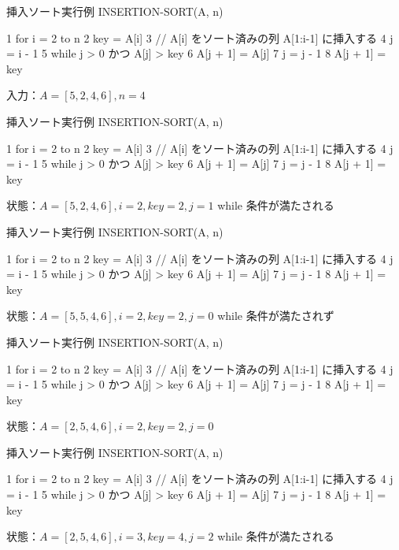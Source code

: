 \documentclass[unicode,11pt,aspectratio=169,notes]{beamer} %
\begin{document}
\begin{frame}[fragile]{挿入ソート}{実行例}
  INSERTION-SORT(A, n)
  \begin{semiverbatim}
1  for i = 2 to n
2    key = A[i]
3    // A[i] をソート済みの列 A[1:i-1] に挿入する
4    j = i - 1
5    while j > 0 かつ A[j] > key
6      A[j + 1] = A[j]
7      j = j - 1
8    A[j + 1] = key
  \end{semiverbatim}
  入力：$A = [5, 2, 4, 6], n = 4$
\end{frame}

\begin{frame}[fragile]{挿入ソート}{実行例}
  INSERTION-SORT(A, n)
  \begin{semiverbatim}
1  for i = 2 to n
2    key = A[i]
3    // A[i] をソート済みの列 A[1:i-1] に挿入する
4    j = i - 1
5    \alert{while j > 0 かつ A[j] > key}
6      A[j + 1] = A[j]
7      j = j - 1
8    A[j + 1] = key
  \end{semiverbatim}
  状態：$A = [5, 2, 4, 6], i = 2, key = 2, j = 1$ while 条件が満たされる
\end{frame}

\begin{frame}[fragile]{挿入ソート}{実行例}
  INSERTION-SORT(A, n)
  \begin{semiverbatim}
1  for i = 2 to n
2    key = A[i]
3    // A[i] をソート済みの列 A[1:i-1] に挿入する
4    j = i - 1
5    \alert{while j > 0 かつ A[j] > key}
6      A[j + 1] = A[j]
7      j = j - 1
8    A[j + 1] = key
  \end{semiverbatim}
  状態：$A = [5, 5, 4, 6], i = 2, key = 2, j = 0$ while 条件が満たされず
\end{frame}

\begin{frame}[fragile]{挿入ソート}{実行例}
  INSERTION-SORT(A, n)
  \begin{semiverbatim}
1  for i = 2 to n
2    key = A[i]
3    // A[i] をソート済みの列 A[1:i-1] に挿入する
4    j = i - 1
5    while j > 0 かつ A[j] > key
6      A[j + 1] = A[j]
7      j = j - 1
8    \alert{A[j + 1] = key}
  \end{semiverbatim}
  状態：$A = [2, 5, 4, 6], i = 2, key = 2, j = 0$
\end{frame}

\begin{frame}[fragile]{挿入ソート}{実行例}
  INSERTION-SORT(A, n)
  \begin{semiverbatim}
1  for i = 2 to n
2    key = A[i]
3    // A[i] をソート済みの列 A[1:i-1] に挿入する
4    j = i - 1
5    \alert{while j > 0 かつ A[j] > key}
6      A[j + 1] = A[j]
7      j = j - 1
8    A[j + 1] = key
  \end{semiverbatim}
  状態：$A = [2, 5, 4, 6], i = 3, key = 4, j = 2$ while 条件が満たされる
\end{frame}
\end{document}
